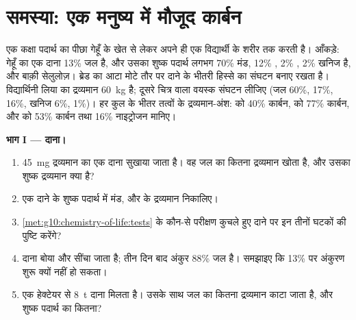 \section{समस्या: एक मनुष्य में मौजूद कार्बन}

\begin{problem}[{सप्ताहांत समस्या --- गेहूँ के खेत से एक शरीर तक: पदार्थ
का लेखा-जोखा, दाने के जल से लेकर इस सवाल तक कि कोई व्यक्ति कितने
किलोग्राम कार्बन ढोता है}]
\label{pb:g10:chemistry-of-life:1}
एक कक्षा पदार्थ का पीछा गेहूँ के खेत से लेकर अपने ही एक विद्यार्थी के
शरीर तक करती है। आँकड़े: गेहूँ का एक दाना 13\% जल है, और उसका शुष्क
पदार्थ लगभग 70\% मंड, 12\% , 2\% , 2\% खनिज है, और बाक़ी
सेलुलोज़। ब्रेड का आटा मोटे तौर पर दाने के भीतरी हिस्से का संघटन बनाए
रखता है। विद्यार्थिनी लिया का द्रव्यमान \qty{60}{kg} है; दूसरे चित्र
वाला वयस्क संघटन लीजिए (जल 60\%,  17\%,  16\%, खनिज 6\%,
 1\%)। हर कुल के भीतर तत्वों के द्रव्यमान-अंश: 
को 40\% कार्बन,  को 77\% कार्बन, और  को 53\% कार्बन तथा
16\% नाइट्रोजन मानिए।

\medskip
\noindent\textbf{भाग I --- दाना।}
\begin{enumerate}
  \item \qty{45}{mg} द्रव्यमान का एक दाना सुखाया जाता है। वह जल का
        कितना द्रव्यमान खोता है, और उसका शुष्क द्रव्यमान क्या है?
  \item एक दाने के शुष्क पदार्थ में मंड,  और  के द्रव्यमान
        निकालिए।
  \item \cref{met:g10:chemistry-of-life:tests} के कौन-से परीक्षण कुचले
        हुए दाने पर इन तीनों घटकों की पुष्टि करेंगे?
  \item दाना बोया और सींचा जाता है; तीन दिन बाद अंकुर 88\% जल है।
        समझाइए कि 13\% पर अंकुरण शुरू क्यों नहीं हो सकता।
  \item एक हेक्टेयर से \qty{8}{t} दाना मिलता है। उसके साथ जल का कितना
        द्रव्यमान काटा जाता है, और शुष्क पदार्थ का कितना?
\end{enumerate}


\end{problem}

